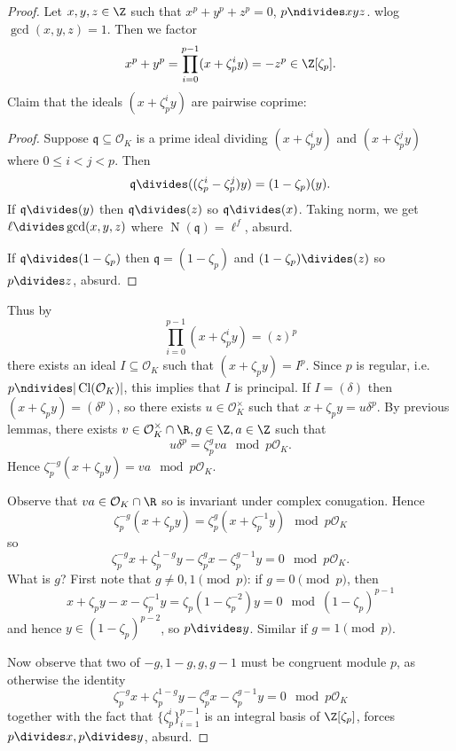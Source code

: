 \documentclass[a4paper]{article}
\renewcommand*{\O}{\mathcal{O}}
\DeclareMathOperator{\n}{N}
\DeclareMathOperator{\Cl}{Cl} %
\begin{document}
\begin{proof}
  Let \(x, y, z \in \Z\) such that \(x^p + y^p + z^p = 0\), \(p \ndivides xyz\). wlog \(\gcd(x, y, z) = 1\). Then we factor
  \[
    x^p + y^p = \prod_{i = 0}^{p - 1} (x + \zeta_p^i y) = -z^p \in \Z[\zeta_p].
  \]
  Claim that the ideals \((x + \zeta_p^i y)\) are pairwise coprime:
  \begin{proof}
    Suppose \(\mathfrak q \subseteq \O_K\) is a prime ideal dividing \((x + \zeta_p^i y)\) and \((x + \zeta_p^j y)\) where \(0 \leq i < j < p\). Then
    \[
      \mathfrak q \divides ((\zeta_p^i - \zeta_p^j) y) = (1 - \zeta_p)(y).
    \]
    If \(\mathfrak q \divides (y)\) then \(\mathfrak q \divides (z)\) so \(\mathfrak q \divides (x)\). Taking norm, we get \(\ell \divides \gcd(x, y, z)\) where \(\n(\mathfrak q) = \ell^f\), absurd.

    If \(\mathfrak q \divides (1 - \zeta_p) \) then \(\mathfrak q = (1 - \zeta_p)\) and \((1 - \zeta_p) \divides (z)\) so \(p \divides z\), absurd.
  \end{proof}

  Thus by
  \[
    \prod_{i = 0}^{p - 1} (x + \zeta_p^i y) = (z)^p
  \]
  there exists an ideal \(I \subseteq \O_K\) such that \((x + \zeta_p y) = I^p\). Since \(p\) is regular, i.e.\ \(p \ndivides |\Cl(\O_K)|\), this implies that \(I\) is principal. If \(I = (\delta)\) then \((x + \zeta_py) = (\delta^p)\), so there exists \(u \in \O_K^\times\) such that \(x + \zeta_p y = u \delta^p\). By previous lemmas, there exists \(v \in \O_K^\times \cap \R, g \in \Z, a \in \Z\) such that
  \[
    u \delta^p = \zeta_p^g va \mod{p\O_K}.
  \]
  Hence \(\zeta_p^{-g} (x + \zeta_p y) = va \mod{p\O_K}\).

  Observe that \(va \in \O_K \cap \R\) so is invariant under complex conugation. Hence
  \[
    \zeta_p^{-g} (x + \zeta_p y) = \zeta_p^g (x + \zeta_p^{-1} y) \mod{p\O_K}
  \]
  so
  \[
    \zeta_p^{-g} x + \zeta_p^{1 - g} y - \zeta_p^g x - \zeta_p^{g - 1} y = 0 \mod{p\O_K}.
  \]
  What is \(g\)? First note that \(g \neq 0, 1 \pmod p\): if \(g = 0 \pmod p\), then
  \[
    x + \zeta_p y - x - \zeta_p^{-1} y = \zeta_p(1 - \zeta_p^{-2}) y = 0 \mod (1 - \zeta_p)^{p - 1}
  \]
  and hence \(y \in (1 - \zeta_p)^{p - 2}\), so \(p \divides y\). Similar if \(g = 1 \pmod p\).

  Now observe that two of \(-g, 1 - g, g, g - 1\) must be congruent module \(p\), as otherwise the identity
  \[
    \zeta_p^{-g} x + \zeta_p^{1 - g} y - \zeta_p^g x - \zeta_p^{g - 1} y = 0 \mod{p\O_K}
  \]
  together with the fact that \(\{\zeta_p^i\}_{i = 1}^{p - 1}\) is an integral basis of \(\Z[\zeta_p]\), forces \(p \divides x, p \divides y\), absurd.


\end{proof}
\end{document}
